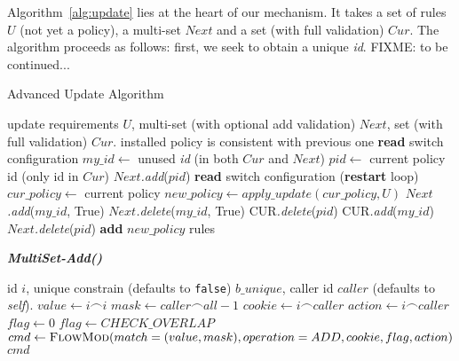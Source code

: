 \documentclass[conference]{sigcomm-alternate}
\newcommand{\concat}[0]{\frown}
\begin{document}
Algorithm~\ref{alg:update} lies at the heart of our mechanism.
It takes a set of rules $U$ (not yet a policy),
a multi-set $Next$ and a set (with full validation) $Cur$.
The algorithm proceeds as follows: first, we seek to
obtain a unique \emph{id}. FIXME: to be continued...

\begin{algorithm}[t]
    \caption{Advanced Update Algorithm}
    \label{alg:update}
    \begin{algorithmic}[1]
    \Require update requirements $U$, multi-set (with optional add validation) $Next$, set (with full validation) $Cur$.
    \Ensure installed policy is consistent with previous one
 		\Repeat
 			\State \textbf{read} switch configuration
 			\State $my\_id\gets$ unused \emph{id} (in both $Cur$ and $Next$)
 			\State $pid\gets$ current policy id (only id in $Cur$)
 			\State $Next$\emph{.add}($pid$)
 			\State \textbf{read} switch configuration
 				 (\textbf{restart} loop)
 			\EndIf
 			\State $cur\_policy\gets$ current policy
 			\State $new\_policy\gets apply\_update(cur\_policy,U)$
 			\startTransaction
 				\State $Next$\emph{.add}($my\_id$, True)
 				\State $Next$\emph{.delete}($my\_id$, True)
	 			\State CUR\emph{.delete}($pid$)
	 			\State CUR\emph{.add}($my\_id$)
				\State $Next$\emph{.delete}($pid$)
	 			\State \textbf{add} $new\_policy$ rules %
 			\endTransaction
			\Return

    \end{algorithmic}
\end{algorithm}

\begin{algorithm}[t]
    \caption{\textbf{\emph{MultiSet-Add()}}}
    \label{alg:multi-add}
    \begin{algorithmic}[1]
    \Require id $i$, unique constrain (defaults to \texttt{false}) $b\_unique$, caller id $caller$ (defaults to \emph{self}).
    		\State $value \gets i\concat i$
    		\State $mask \gets caller\concat all-1$
    		\State $cookie \gets i\concat caller$
    		\State $action \gets i\concat caller$
    			\State $flag \gets 0$
    		\Else
    		    \State $flag \gets CHECK\_OVERLAP$
    		\EndIf
    					\State $cmd\gets \textsc{FlowMod}(match=(value,mask), operation = ADD, cookie, flag, action) $
			\Return $cmd$
    \end{algorithmic}
\end{algorithm}
\end{document}
